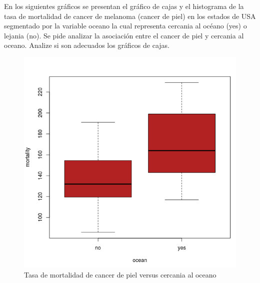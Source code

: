 \documentclass[11pt,evaluacion]{uescimat}
\begin{document}
\begin{problema}
En los siguientes gráficos se presentan el gráfico de cajas y el histograma de la tasa de mortalidad de cancer de melanoma (cancer de piel) en los estados de USA segmentado por la variable oceano la cual representa cercania al océano (yes) o lejania (no). Se pide analizar la asociación entre el cancer de piel y cercania al oceano. Analize si son adecuados los gráficos de cajas.

\begin{figure}[H]
\begin{centering}
\includegraphics[scale=0.30]{imagen5.png}
\par\end{centering}
\caption{Tasa de mortalidad de cancer de piel versus cercania al oceano}
\end{figure}


\end{problema}
\end{document}

